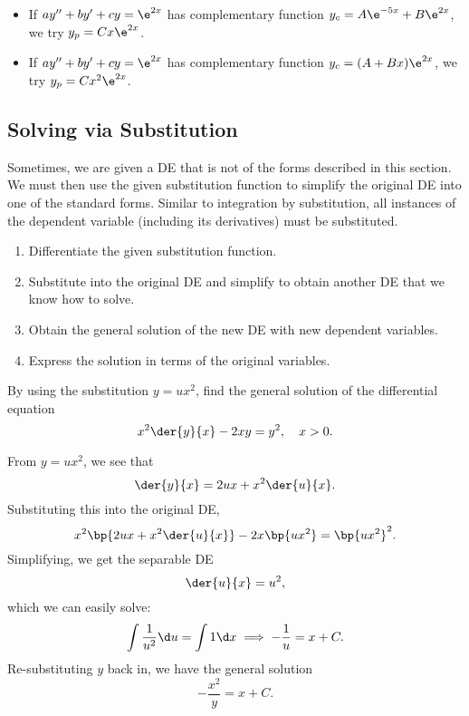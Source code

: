 \begin{example}[Adjusting $y_p$]
    \phantom{.}
    \begin{itemize}
        \item If $a y'' + by' + cy = \e^{2x}$ has complementary function $y_c = A\e^{-5x} + B\e^{2x}$, we try $y_p = Cx\e^{2x}$.
        \item If $a y'' + by' + cy = \e^{2x}$ has complementary function $y_c = (A + Bx) \e^{2x}$, we try $y_p = Cx^2\e^{2x}$.
    \end{itemize}
\end{example}

\subsection{Solving via Substitution}

Sometimes, we are given a DE that is not of the forms described in this section. We must then use the given substitution function to simplify the original DE into one of the standard forms. Similar to integration by substitution, all instances of the dependent variable (including its derivatives) must be substituted.

\begin{recipe}
    \phantom{.}
    \renewcommand{\theenumi}{\arabic{enumi}.}
    \begin{enumerate}
        \item Differentiate the given substitution function.
        \item Substitute into the original DE and simplify to obtain another DE that we know how to solve.
        \item Obtain the general solution of the new DE with new dependent variables.
        \item Express the solution in terms of the original variables.
    \end{enumerate}
    \renewcommand{\theenumi}{(\alph{enumi})}
\end{recipe}

\begin{sample}
    By using the substitution $y = ux^2$, find the general solution of the differential equation \[x^2 \der{y}{x} - 2xy = y^2, \quad x > 0.\]
\end{sample}
\begin{sampans}
    From $y = ux^2$, we see that \[\der{y}{x} = 2ux + x^2 \der{u}{x}.\] Substituting this into the original DE, \[x^2 \bp{2ux + x^2 \der{u}{x}} - 2x \bp{ux^2} = \bp{ux^2}^2.\] Simplifying, we get the separable DE \[\der{u}{x} = u^2,\] which we can easily solve: \[\int \frac1{u^2} \d u = \int 1 \d x \implies -\frac1{u} = x + C.\] Re-substituting $y$ back in, we have the general solution \[-\frac{x^2}{y} = x + C.\]
\end{sampans}


